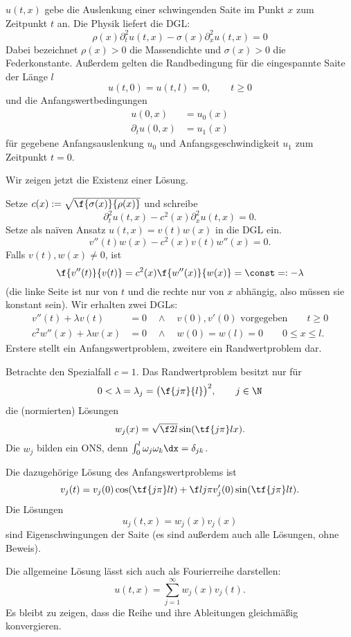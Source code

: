 \setcounter{thm}{4} %
\begin{ex} %
	$u(t,x)$ gebe die Auslenkung einer schwingenden Saite im Punkt $x$ zum Zeitpunkt $t$ an.
	Die Physik liefert die DGL:
	\[
		\rho(x) \partial_t^2 u(t,x) - \sigma(x) \partial_x^2 u(t,x) = 0
	\]
	Dabei bezeichnet $\rho(x) > 0$ die Massendichte und $\sigma(x) > 0$ die Federkonstante.
	Außerdem gelten die Randbedingung für die eingespannte Saite der Länge $l$
	\[
		u(t,0) = u(t,l) = 0,
		\qquad t \ge 0
	\]
	und die Anfangswertbedingungen
	\begin{align*}
		u(0,x) &= u_0(x) \\
		\partial_t u(0,x) &= u_1(x)
	\end{align*}
	für gegebene Anfangsauslenkung $u_0$ und Anfangsgeschwindigkeit $u_1$ zum Zeitpunkt $t = 0$.

	Wir zeigen jetzt die Existenz einer Lösung.

	Setze $c(x) := \sqrt{\f {\sigma(x)}{\rho(x)}}$ und schreibe
	\[
		\partial_t^2 u(t,x) - c^2(x) \partial_x^2 u(t,x) = 0.
	\]
	Setze als naïven Ansatz $u(t,x) = v(t)w(x)$ in die DGL ein.
	\[
		v''(t) w(x) - c^2(x) v(t) w''(x) = 0.
	\]
	Falls $v(t),w(x) \neq 0$, ist
	\[
		\f {v''(t)}{v(t)} = c^2(x) \f {w''(x)}{w(x)} = \const =: - \lambda
	\]
	(die linke Seite ist nur von $t$ und die rechte nur von $x$ abhängig, also müssen sie konstant sein).
	Wir erhalten zwei DGLs:
	\begin{align*}
		v''(t) + \lambda v(t) &= 0 \quad \land  \quad v(0), v'(0) \text{ vorgegeben} \qquad t \ge 0 \\
		c^2 w''(x) + \lambda w(x) &= 0 \quad \land \quad w(0) = w(l) = 0 \qquad 0 \le x \le l.
	\end{align*}
	Erstere stellt ein Anfangswertproblem, zweitere ein Randwertproblem dar.

	Betrachte den Spezialfall $c = 1$.
	Das Randwertproblem besitzt nur für
	\[
		0 < \lambda = \lambda_j = \big( \f {j\pi}{l} \big)^2,
		\qquad j\in\N
	\]
	die (normierten) Lösungen
	\[
		w_j(x) = \sqrt{\f 2l} \sin( \tf {j\pi}l x).
	\]
	Die $w_j$ bilden ein ONS, denn $\int_{0}^l \omega_j \omega_k \dx = \delta_{jk}$.

	Die dazugehörige Lösung des Anfangswertproblems ist
	\[
		v_j(t) = v_j(0) \cos(\tf {j\pi}l t) + \f l{j\pi} v_j'(0) \sin(\tf{j\pi}l t).
	\]
	Die Lösungen
	\[
		u_j(t,x) = w_j(x) v_j(x)
	\]
	sind Eigenschwingungen der Saite (es sind außerdem auch alle Lösungen, ohne Beweis).

	Die allgemeine Lösung lässt sich auch als Fourierreihe darstellen:
	\[
		u(t,x) = \sum_{j=1}^\infty w_j(x) v_j(t).
	\]
	Es bleibt zu zeigen, dass die Reihe und ihre Ableitungen gleichmäßig konvergieren.
\end{ex}


